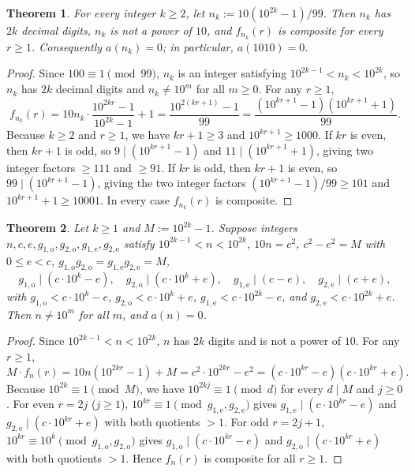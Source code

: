 \documentclass[11pt]{article}
\newtheorem{theorem}{Theorem}[section]
\theoremstyle{remark}
\begin{document}
\begin{theorem}\label{thm:rep10}
For every integer $k \ge 2$, let $n_k := 10(10^{2k} - 1)/99$. Then $n_k$ has $2k$ decimal digits, $n_k$ is not a power of $10$, and $f_{n_k}(r)$ is composite for every $r \ge 1$. Consequently $a(n_k) = 0$; in particular, $a(1010) = 0$.
\end{theorem}

\begin{proof}
Since $100 \equiv 1 \pmod{99}$, $n_k$ is an integer satisfying $10^{2k-1} < n_k < 10^{2k}$, so $n_k$ has $2k$ decimal digits and $n_k \ne 10^m$ for all $m \ge 0$. For any $r \ge 1$,
\[
  f_{n_k}(r) = 10 n_k \cdot \frac{10^{2kr} - 1}{10^{2k} - 1} + 1 = \frac{10^{2(kr+1)} - 1}{99} = \frac{(10^{kr+1} - 1)(10^{kr+1} + 1)}{99}.
\]
Because $k \ge 2$ and $r \ge 1$, we have $kr + 1 \ge 3$ and $10^{kr+1} \ge 1000$. If $kr$ is even, then $kr + 1$ is odd, so $9 \mid (10^{kr+1} - 1)$ and $11 \mid (10^{kr+1} + 1)$, giving two integer factors $\ge 111$ and $\ge 91$. If $kr$ is odd, then $kr + 1$ is even, so $99 \mid (10^{kr+1} - 1)$, giving the two integer factors $(10^{kr+1} - 1)/99 \ge 101$ and $10^{kr+1} + 1 \ge 10001$. In every case $f_{n_k}(r)$ is composite.
\end{proof}

\begin{theorem}\label{thm:diffsq}
Let $k \ge 1$ and $M := 10^{2k} - 1$. Suppose integers $n, c, e, g_{1,\mathrm{o}}, g_{2,\mathrm{o}}, g_{1,\mathrm{e}}, g_{2,\mathrm{e}}$ satisfy $10^{2k-1} < n < 10^{2k}$, $10n = c^2$, $c^2 - e^2 = M$ with $0 \le e < c$, $g_{1,\mathrm{o}} g_{2,\mathrm{o}} = g_{1,\mathrm{e}} g_{2,\mathrm{e}} = M$,
\[
  g_{1,\mathrm{o}} \mid (c \cdot 10^k - e),\quad g_{2,\mathrm{o}} \mid (c \cdot 10^k + e),\quad g_{1,\mathrm{e}} \mid (c - e),\quad g_{2,\mathrm{e}} \mid (c + e),
\]
with $g_{1,\mathrm{o}} < c \cdot 10^k - e$, $g_{2,\mathrm{o}} < c \cdot 10^k + e$, $g_{1,\mathrm{e}} < c \cdot 10^{2k} - e$, and $g_{2,\mathrm{e}} < c \cdot 10^{2k} + e$. Then $n \ne 10^m$ for all $m$, and $a(n) = 0$.
\end{theorem}

\begin{proof}
Since $10^{2k-1} < n < 10^{2k}$, $n$ has $2k$ digits and is not a power of $10$. For any $r \ge 1$,
\[
  M \cdot f_n(r) = 10n(10^{2kr} - 1) + M = c^2 \cdot 10^{2kr} - e^2 = (c \cdot 10^{kr} - e)(c \cdot 10^{kr} + e).
\]
Because $10^{2k} \equiv 1 \pmod M$, we have $10^{2kj} \equiv 1 \pmod d$ for every $d \mid M$ and $j \ge 0$. For even $r = 2j$ ($j \ge 1$), $10^{kr} \equiv 1 \pmod{g_{1,\mathrm{e}}, g_{2,\mathrm{e}}}$ gives $g_{1,\mathrm{e}} \mid (c \cdot 10^{kr} - e)$ and $g_{2,\mathrm{e}} \mid (c \cdot 10^{kr} + e)$ with both quotients $> 1$. For odd $r = 2j + 1$, $10^{kr} \equiv 10^k \pmod{g_{1,\mathrm{o}}, g_{2,\mathrm{o}}}$ gives $g_{1,\mathrm{o}} \mid (c \cdot 10^{kr} - e)$ and $g_{2,\mathrm{o}} \mid (c \cdot 10^{kr} + e)$ with both quotients $> 1$. Hence $f_n(r)$ is composite for all $r \ge 1$.
\end{proof}
\end{document}
